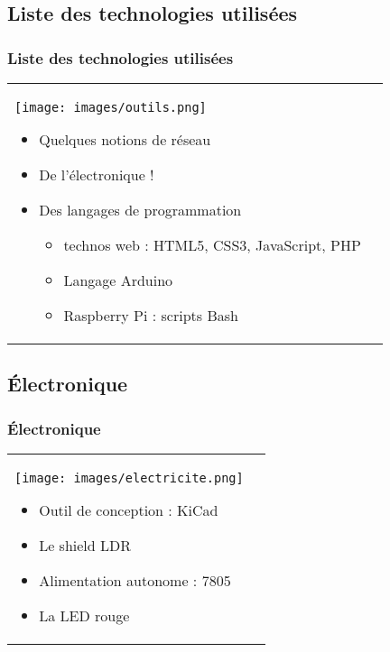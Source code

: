 \documentclass[handout]{beamer}
\begin{document}
	\subsection{Liste des technologies utilisées}
		\begin{frame}
		\frametitle{Liste des technologies utilisées}

		\begin{tabular}{l l}
			\begin{minipage}{0.2\textwidth}
				\begin{center}
					\texttt{[image: images/outils.png]}
				\end{center}
			\end{minipage}

			\begin{minipage}{0.8\textwidth}
				\begin{itemize}
					\item Quelques notions de réseau
					\item De l'électronique !
					\item Des langages de programmation
					\begin{itemize}
						\item technos web : HTML5, CSS3, JavaScript, PHP
						\item Langage Arduino
						\item Raspberry Pi : scripts Bash
					\end{itemize}
				\end{itemize}
			\end{minipage}
			
		\end{tabular}
		\end{frame}

	\subsection{Électronique}
		\begin{frame}
		\frametitle{Électronique}

		\begin{tabular}{l l}
			\begin{minipage}{0.2\textwidth}
				\begin{center}
					\texttt{[image: images/electricite.png]}
				\end{center}
			\end{minipage}

			\begin{minipage}{0.8\textwidth}
				\begin{itemize}
					\item Outil de conception : KiCad
					\item Le shield LDR
					\item Alimentation autonome : 7805
					\item La LED rouge
				\end{itemize}
			\end{minipage}
			
		\end{tabular}
		\end{frame}
\end{document}

